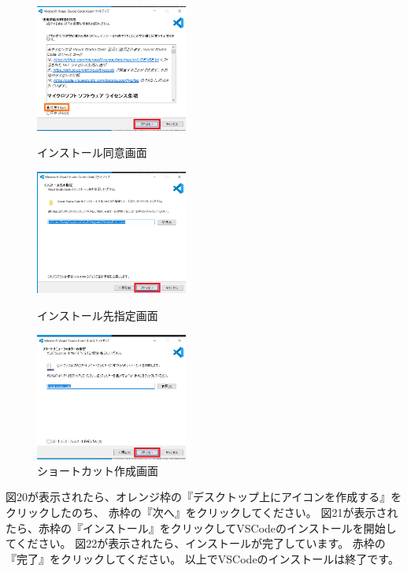 \documentclass[dvipdfmx]{jsarticle}
\begin{document}
\begin{figure}[H]
    \begin{minipage}[b]{0.33\linewidth}
        \centering
        \includegraphics[width=5cm]{images/VSCodeInstaller1.png}
        \caption{インストール同意画面}
    \end{minipage}
    \begin{minipage}[b]{0.33\linewidth}
        \centering
        \includegraphics[width=5cm]{images/VSCodeInstaller2.png}
        \caption{インストール先指定画面}
    \end{minipage}
    \begin{minipage}[b]{0.33\linewidth}
        \centering
        \includegraphics[width=5cm]{images/VSCodeInstaller3.png}
        \caption{ショートカット作成画面}
    \end{minipage}
\end{figure}

図20が表示されたら、オレンジ枠の『デスクトップ上にアイコンを作成する』をクリックしたのち、
赤枠の『次へ』をクリックしてください。
図21が表示されたら、赤枠の『インストール』をクリックしてVSCodeのインストールを開始してください。
図22が表示されたら、インストールが完了しています。
赤枠の『完了』をクリックしてください。
以上でVSCodeのインストールは終了です。
\end{document}
